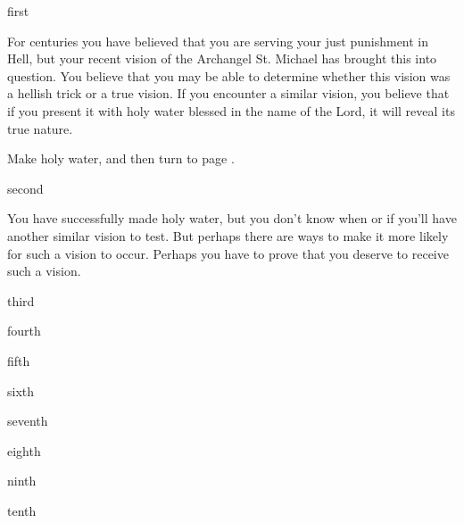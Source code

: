 \documentclass[greennotebook]{guildcamp4} %
\begin{document}
\startnotebook{\nJoanBooklet{}}

\begin{page}{first}

For centuries you have believed that you are serving your just punishment in Hell, but your recent vision of the Archangel St. Michael has brought this into question. You believe that you may be able to determine whether this vision was a hellish trick or a true vision. If you encounter a similar vision, you believe that if you present it with holy water blessed in the name of the Lord, it will reveal its true nature.

Make holy water, and then turn to page .

\end{page}

\begin{page}{second}

You have successfully made holy water, but you don't know when or if you'll have another similar vision to test. But perhaps there are ways to make it more likely for such a vision to occur. Perhaps you have to prove that you deserve to receive such a vision.

\end{page}

\begin{page}{third}



\end{page}

\begin{page}{fourth}



\end{page}

\begin{page}{fifth}



\end{page}

\begin{page}{sixth}



\end{page}

\begin{page}{seventh}



\end{page}

\begin{page}{eighth}



\end{page}

\begin{page}{ninth}



\end{page}

\begin{page}{tenth}



\end{page}

\endnotebook
\end{document}
